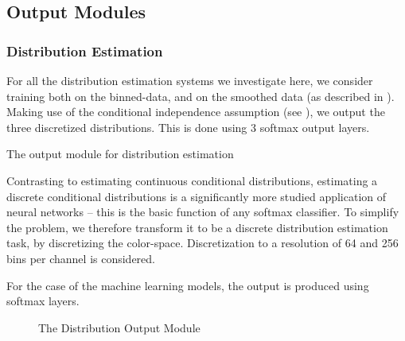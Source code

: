 \documentclass[11pt,a4paper]{article}
\begin{document}
\subsection{Output Modules}
\subsubsection{Distribution Estimation}

For all the distribution estimation systems we investigate here, 
we consider training both on the binned-data, and on the smoothed data (as described in ).
Making use of the conditional independence assumption (see ), we output the three discretized distributions.
This is done using 3 softmax output layers.

The output module for distribution estimation 

Contrasting to estimating continuous conditional distributions, 
estimating a discrete conditional distributions is a significantly more studied application of neural networks
-- this is the basic function of any softmax classifier.
To simplify the problem, we therefore transform it to be a discrete distribution estimation task, by discretizing the color-space.
Discretization to a resolution of 64 and 256 bins per channel is considered.


For the case of the machine learning models, the output is produced using softmax layers.


\begin{figure}
	\newcommand{\picwidth}{60pt}
	
	\caption{The Distribution Output Module \label{fig:distoutmod}}
\end{figure}
	
\end{document}
